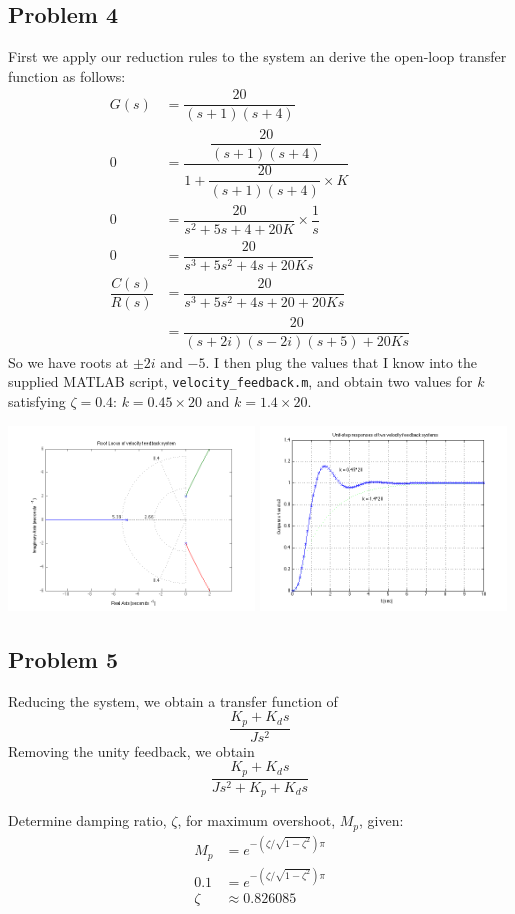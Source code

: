 \documentclass[letterpaper,10pt]{article}
\begin{document}
\subsection*{Problem 4}
First we apply our reduction rules to the system an derive the open-loop transfer function as follows:
\begin{align*}
	G(s) &= \dfrac{20}{(s+1)(s+4)} \\
	0 &= \dfrac{\dfrac{20}{(s+1)(s+4)}}{1+\dfrac{20}{(s+1)(s+4)}\times K} \\
	0 &= \dfrac{20}{s^{2}+5s+4+20K} \times \dfrac{1}{s} \\
	0 &= \dfrac{20}{s^{3}+5s^{2}+4s+20Ks} \\
	\dfrac{C(s)}{R(s)} &= \dfrac{20}{s^{3}+5s^{2}+4s+20+20Ks} \\
	&= \dfrac{20}{(s+2i)(s-2i)(s+5)+20Ks} 
\end{align*}
So we have roots at $\pm 2i$ and $-5$.  I then plug the values that I know into the supplied MATLAB script, \texttt{velocity\_feedback.m}, and obtain two values for $k$ satisfying $\zeta = 0.4$: $k = 0.45\times20$ and $k = 1.4\times20$.
\begin{center}
	\includegraphics[width=0.49\textwidth]{homework04-7-4a.png}
	\includegraphics[width=0.49\textwidth]{homework04-7-4b.png}
\end{center}

\subsection*{Problem 5}
Reducing the system, we obtain a transfer function of
$$\dfrac{K_{p}+K_{d}s}{Js^{2}}$$
Removing the unity feedback, we obtain
$$\dfrac{K_{p}+K_{d}s}{Js^{2}+K_{p}+K_{d}s}$$

Determine damping ratio, $\zeta$, for maximum overshoot, $M_{p}$, given:
\begin{align*}
	M_{p} &= e^{-\left(\zeta/\sqrt{1-\zeta^{2}}\right)\pi} \\
	0.1 &= e^{-\left(\zeta/\sqrt{1-\zeta^{2}}\right)\pi} \\
	\zeta &\approx 0.826085
\end{align*}
\end{document}
